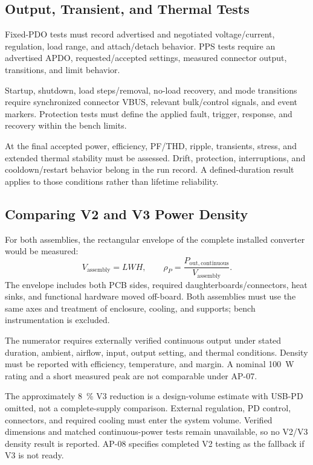 \subsection{Output, Transient, and Thermal Tests}

Fixed-PDO tests must record advertised and negotiated voltage/current,
regulation, load range, and attach/detach behavior. PPS tests require an
advertised APDO, requested/accepted settings, measured connector output,
transitions, and limit behavior.

Startup, shutdown, load steps/removal, no-load recovery, and mode transitions
require synchronized connector VBUS, relevant bulk/control signals, and event
markers. Protection tests must define the applied fault, trigger, response,
and recovery within the bench limits.

At the final accepted power, efficiency, PF/THD, ripple, transients, stress,
and extended thermal stability must be assessed. Drift, protection,
interruptions, and cooldown/restart behavior belong in the run record.
A defined-duration result applies to those conditions rather than lifetime
reliability.

\subsection{Comparing V2 and V3 Power Density}
\label{sec:method-density}

For both assemblies, the rectangular envelope of the complete installed
converter would be measured:
\begin{equation}
 V_{\mathrm{assembly}}=LWH,
 \qquad
 \rho_P=\frac{P_{\mathrm{out,continuous}}}{V_{\mathrm{assembly}}}.
 \label{eq:method-assembly-density}
\end{equation}
The envelope includes both PCB sides, required daughterboards/connectors,
heat sinks, and functional hardware moved off-board. Both assemblies must
use the same axes and treatment of enclosure, cooling, and supports; bench
instrumentation is excluded.

The numerator requires externally verified continuous output under stated
duration, ambient, airflow, input, output setting, and thermal conditions.
Density must be reported with efficiency, temperature, and margin. A nominal
\SI{100}{\watt} rating and a short measured peak are not comparable under AP-07.

The approximately \SI{8}{\percent} V3 reduction is a design-volume estimate
with USB-PD omitted, not a complete-supply comparison. External regulation,
PD control, connectors, and required cooling must enter the system volume.
Verified dimensions and matched continuous-power tests remain unavailable,
so no V2/V3 density result is reported. AP-08 specifies completed V2 testing
as the fallback if V3 is not ready.
